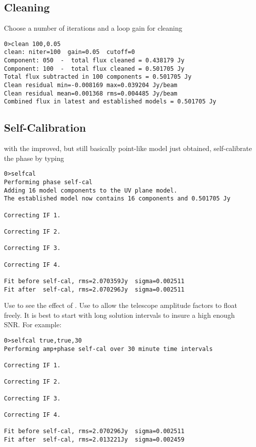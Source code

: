 \documentclass[a4paper,11pt]{article}
\begin{document}
 \subsection{Cleaning}
\normalsize
\par Choose a number of iterations and a loop gain for cleaning
\scriptsize
\begin{lstlisting}
0>clean 100,0.05
clean: niter=100  gain=0.05  cutoff=0
Component: 050  -  total flux cleaned = 0.438179 Jy
Component: 100  -  total flux cleaned = 0.501705 Jy
Total flux subtracted in 100 components = 0.501705 Jy
Clean residual min=-0.008169 max=0.039204 Jy/beam
Clean residual mean=0.001368 rms=0.004485 Jy/beam
Combined flux in latest and established models = 0.501705 Jy
\end{lstlisting}
\normalsize
\subsection{Self-Calibration}
\par with the improved, but still basically point-like model just obtained, self-calibrate the phase by typing
\scriptsize
\begin{lstlisting}
0>selfcal
Performing phase self-cal
Adding 16 model components to the UV plane model.
The established model now contains 16 components and 0.501705 Jy

Correcting IF 1.

Correcting IF 2.

Correcting IF 3.

Correcting IF 4.

Fit before self-cal, rms=2.070359Jy  sigma=0.002511
Fit after  self-cal, rms=2.070296Jy  sigma=0.002511

\end{lstlisting}
\normalsize
\par Use  to see the effect of . Use  to allow the telescope amplitude factors to float freely. It is best to start with long solution intervals to insure a high enough SNR. For example:
\scriptsize
\begin{lstlisting}
0>selfcal true,true,30
Performing amp+phase self-cal over 30 minute time intervals

Correcting IF 1.

Correcting IF 2.

Correcting IF 3.

Correcting IF 4.

Fit before self-cal, rms=2.070296Jy  sigma=0.002511
Fit after  self-cal, rms=2.013221Jy  sigma=0.002459
\end{lstlisting}
\end{document}
